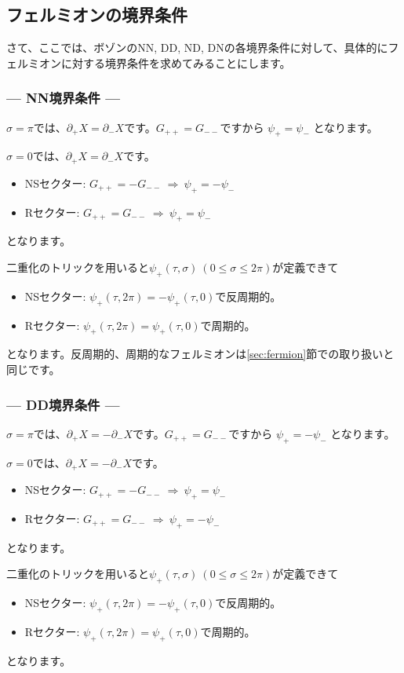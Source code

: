 \documentclass[report,paper=a4, fontsize=12pt, line_length=16cm, number_of_lines=34,dvipdfmx]{jlreq}
\numberwithin{equation}{chapter}
\numberwithin{equation}{section}
\newcommand{\del}{\partial}
\begin{document}
\subsection{フェルミオンの境界条件}
さて、ここでは、ボゾンのNN, DD, ND, DNの各境界条件に対して、具体的にフェルミオンに対する境界条件を求めてみることにします。

\subsubsection*{--- NN境界条件 ---}
$\sigma=\pi$では、$\del_{+}X=\del_{-}X$です。$G_{++}=G_{--}$ですから
$\psi_{+}=\psi_{-}$
となります。

$\sigma=0$では、$\del_{+}X=\del_{-}X$です。
\begin{itemize}
  \item NSセクター: $G_{++}=-G_{--}\ \Rightarrow\ 
  \psi_{+}=-\psi_{-}$
  \item Rセクター: $G_{++}=G_{--}\ \Rightarrow\ 
  \psi_{+}=\psi_{-}$
\end{itemize}
となります。

二重化のトリックを用いると$\psi_{+}(\tau,\sigma)\ (0\le \sigma \le 2\pi)$が定義できて
\begin{itemize}
  \item NSセクター: $\psi_{+}(\tau,2\pi)=-\psi_{+}(\tau,0)$で反周期的。
  \item Rセクター: $\psi_{+}(\tau,2\pi)=\psi_{+}(\tau,0)$で周期的。
\end{itemize}
となります。反周期的、周期的なフェルミオンは\ref{sec:fermion}節での取り扱いと同じです。

\subsubsection*{--- DD境界条件 ---}
$\sigma=\pi$では、$\del_{+}X=-\del_{-}X$です。$G_{++}=G_{--}$ですから
$\psi_{+}=-\psi_{-}$
となります。

$\sigma=0$では、$\del_{+}X=-\del_{-}X$です。
\begin{itemize}
  \item NSセクター: $G_{++}=-G_{--}\ \Rightarrow\ 
  \psi_{+}=\psi_{-}$
  \item Rセクター: $G_{++}=G_{--}\ \Rightarrow\ 
  \psi_{+}=-\psi_{-}$
\end{itemize}
となります。

二重化のトリックを用いると$\psi_{+}(\tau,\sigma)\ (0\le \sigma \le 2\pi)$が定義できて
\begin{itemize}
  \item NSセクター: $\psi_{+}(\tau,2\pi)=-\psi_{+}(\tau,0)$で反周期的。
  \item Rセクター: $\psi_{+}(\tau,2\pi)=\psi_{+}(\tau,0)$で周期的。
\end{itemize}
となります。
\end{document}
